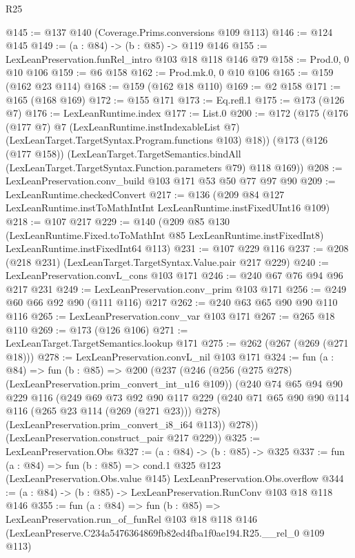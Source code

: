 \begin{lexlean}{R25}
\begin{coremodule}
@145 := @137 @140 (Coverage.Prims.conversions @109 @113)
@146 := @124 @145
@149 := (a : @84) -> (b : @85) -> @119 @146
@155 := LexLeanPreservation.funRel_intro @103 @18 @118 @146 @79
@158 := Prod.{0, 0} @10 @106
@159 := @6 @158
@162 := Prod.mk.{0, 0} @10 @106
@165 := @159 (@162 @23 @114)
@168 := @159 (@162 @18 @110)
@169 := @2 @158
@171 := @165 (@168 @169)
@172 := @155 @171
@173 := Eq.refl.{1}
@175 := @173 (@126 @7)
@176 := LexLeanRuntime.index
@177 := List.{0}
@200 := @172
    (@175
      (@176
        (@177 @7)
        @7
        (LexLeanRuntime.instIndexableList @7)
        (LexLeanTarget.TargetSyntax.Program.functions @103)
        @18))
    (@173
      (@126 (@177 @158))
      (LexLeanTarget.TargetSemantics.bindAll
        (LexLeanTarget.TargetSyntax.Function.parameters @79)
        @118
        @169))
@208 := LexLeanPreservation.conv_build @103 @171 @53 @50 @77 @97 @90
@209 := LexLeanRuntime.checkedConvert
@217 := @136 (@209 @84 @127 LexLeanRuntime.instToMathIntInt LexLeanRuntime.instFixedUInt16 @109)
@218 := @107 @217
@229 := @140
    (@209
      @85
      @130
      (LexLeanRuntime.Fixed.toToMathInt @85 LexLeanRuntime.instFixedInt8)
      LexLeanRuntime.instFixedInt64
      @113)
@231 := @107 @229 @116
@237 := @208 (@218 @231) (LexLeanTarget.TargetSyntax.Value.pair @217 @229)
@240 := LexLeanPreservation.convL_cons @103 @171
@246 := @240 @67 @76 @94 @96 @217 @231
@249 := LexLeanPreservation.conv_prim @103 @171
@256 := @249 @60 @66 @92 @90 (@111 @116) @217
@262 := @240 @63 @65 @90 @90 @110 @116
@265 := LexLeanPreservation.conv_var @103 @171
@267 := @265 @18 @110
@269 := @173 (@126 @106)
@271 := LexLeanTarget.TargetSemantics.lookup @171
@275 := @262 (@267 (@269 (@271 @18)))
@278 := LexLeanPreservation.convL_nil @103 @171
@324 := fun (a : @84) =>
  fun (b : @85) =>
  @200
    (@237
      (@246
        (@256 (@275 @278) (LexLeanPreservation.prim_convert_int_u16 @109))
        (@240
          @74
          @65
          @94
          @90
          @229
          @116
          (@249
            @69
            @73
            @92
            @90
            @117
            @229
            (@240 @71 @65 @90 @90 @114 @116 (@265 @23 @114 (@269 (@271 @23))) @278)
            (LexLeanPreservation.prim_convert_i8_i64 @113))
          @278))
      (LexLeanPreservation.construct_pair @217 @229))
@325 := LexLeanPreservation.Obs
@327 := (a : @84) -> (b : @85) -> @325
@337 := fun (a : @84) =>
  fun (b : @85) =>
  cond.{1} @325 @123 (LexLeanPreservation.Obs.value @145) LexLeanPreservation.Obs.overflow
@344 := (a : @84) -> (b : @85) -> LexLeanPreservation.RunConv @103 @18 @118 @146
@355 := fun (a : @84) =>
  fun (b : @85) =>
  LexLeanPreservation.run_of_funRel
    @103
    @18
    @118
    @146
    (LexLeanPreserve.C234a5476364869fb82ed4fba1f0ae194.R25.__rel_0 @109 @113)
\end{coremodule}
\end{lexlean}
